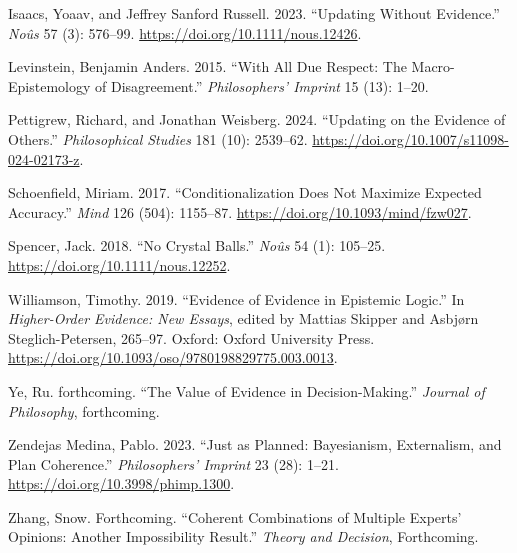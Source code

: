 \documentclass[
  12pt,
  letterpaper,
  DIV=11,
  numbers=noendperiod]{scrartcl}
\newlength{\cslhangindent}
\newenvironment{CSLReferences}[2] %
 {\begin{list}{}{%
  \setlength{\itemindent}{0pt}
  \setlength{\leftmargin}{0pt}
  \setlength{\parsep}{0pt}
  \ifodd #1
   \setlength{\leftmargin}{\cslhangindent}
   \setlength{\itemindent}{-1\cslhangindent}
  \fi
  \setlength{\itemsep}{#2\baselineskip}}}
 {\end{list}}
\begin{document}
\begin{CSLReferences}{1}{0}
Isaacs, Yoaav, and Jeffrey Sanford Russell. 2023. {``Updating Without
Evidence.''} \emph{Noûs} 57 (3): 576--99.
\url{https://doi.org/10.1111/nous.12426}.

Levinstein, Benjamin Anders. 2015. {``With All Due Respect: The
Macro-Epistemology of Disagreement.''} \emph{Philosophers' Imprint} 15
(13): 1--20.

Pettigrew, Richard, and Jonathan Weisberg. 2024. {``Updating on the
Evidence of Others.''} \emph{Philosophical Studies} 181 (10): 2539--62.
\url{https://doi.org/10.1007/s11098-024-02173-z}.

Schoenfield, Miriam. 2017. {``Conditionalization Does Not Maximize
Expected Accuracy.''} \emph{Mind} 126 (504): 1155--87.
\url{https://doi.org/10.1093/mind/fzw027}.

Spencer, Jack. 2018. {``No Crystal Balls.''} \emph{Noûs} 54 (1):
105--25. \url{https://doi.org/10.1111/nous.12252}.

Williamson, Timothy. 2019. {``Evidence of Evidence in Epistemic
Logic.''} In \emph{Higher-Order Evidence: New Essays}, edited by Mattias
Skipper and Asbjørn Steglich-Petersen, 265--97. Oxford: {O}xford
{U}niversity {P}ress.
\url{https://doi.org/10.1093/oso/9780198829775.003.0013}.

Ye, Ru. forthcoming. {``The Value of Evidence in Decision-Making.''}
\emph{Journal of Philosophy}, forthcoming.

Zendejas Medina, Pablo. 2023. {``Just as Planned: Bayesianism,
Externalism, and Plan Coherence.''} \emph{Philosophers' Imprint} 23
(28): 1--21. \url{https://doi.org/10.3998/phimp.1300}.

Zhang, Snow. Forthcoming. {``Coherent Combinations of Multiple Experts'
Opinions: Another Impossibility Result.''} \emph{Theory and Decision},
Forthcoming.

\end{CSLReferences}
\end{document}
